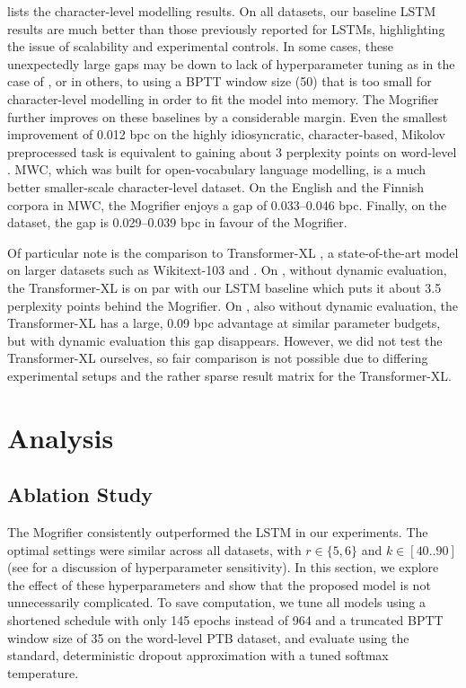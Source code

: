  lists the character-level modelling
results.
%
On all datasets, our baseline LSTM results are much better than those
previously reported for LSTMs, highlighting the issue of scalability
and experimental controls.
%
In some cases, these unexpectedly large gaps may be down to lack of
hyperparameter tuning as in the case of \cite{merity2017regularizing},
or in others, to using a BPTT window size (50) that is too small for
character-level modelling \citep{melis2017state} in order to fit the
model into memory.
%
The Mogrifier further improves on these baselines by a considerable
margin.
%
Even the smallest improvement of 0.012 bpc on the highly
idiosyncratic, character-based, Mikolov preprocessed \ptb task is
equivalent to gaining about 3 perplexity points on word-level \ptb.
%
MWC, which was built for open-vocabulary language modelling, is a much
better smaller-scale character-level dataset.
%
On the English and the Finnish corpora in MWC, the Mogrifier enjoys a
gap of 0.033--0.046 bpc.
%
Finally, on the \enwik dataset, the gap is 0.029--0.039 bpc in favour
of the Mogrifier.

Of particular note is the comparison to Transformer-XL
\citep{dai2019transformer}, a state-of-the-art model on larger
datasets such as Wikitext-103 and \enwik.
%
On \ptb, without dynamic evaluation, the Transformer-XL is on par with
our LSTM baseline which puts it about 3.5 perplexity points behind the
Mogrifier.
%
On \enwik, also without dynamic evaluation, the Transformer-XL has a
large, 0.09 bpc advantage at similar parameter budgets, but with
dynamic evaluation this gap disappears.
%
However, we did not test the Transformer-XL ourselves, so fair
comparison is not possible due to differing experimental setups and
the rather sparse result matrix for the Transformer-XL.

\section{Analysis}
\label{sec:mog-analysis}

\subsection{Ablation Study}

The Mogrifier consistently outperformed the LSTM in our experiments.
%
The optimal settings were similar across all datasets, with $r \in
\{5,6\}$ and $k \in [40..90]$ (see
 for a discussion of
hyperparameter sensitivity).
%
In this section, we explore the effect of these hyperparameters and
show that the proposed model is not unnecessarily complicated.
%
To save computation, we tune all models using a shortened schedule
with only 145 epochs instead of 964 and a truncated BPTT window size
of 35 on the word-level PTB dataset, and evaluate using the standard,
deterministic dropout approximation with a tuned softmax temperature.

